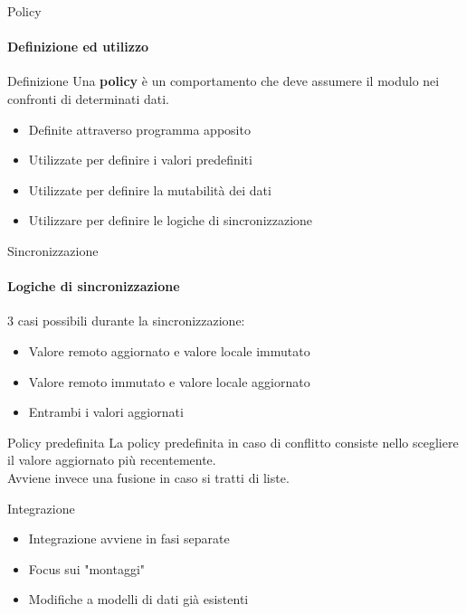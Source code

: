 \documentclass{beamer}
\begin{document}
\begin{darkframes}
  \begin{frame}{Policy}
    \framesubtitle{Definizione ed utilizzo}
    \begin{block}{Definizione}
      Una \textbf{policy} è un comportamento che deve assumere il modulo nei confronti di determinati dati.
    \end{block}
    \begin{itemize}
      \item Definite attraverso programma apposito
      \item Utilizzate per definire i valori predefiniti
      \item Utilizzate per definire la mutabilità dei dati
      \item Utilizzare per definire le logiche di sincronizzazione
    \end{itemize}

  \end{frame}

  \begin{frame}{Sincronizzazione}
    \framesubtitle{Logiche di sincronizzazione}
    3 casi possibili durante la sincronizzazione:
    \begin{itemize}
      \item Valore remoto aggiornato e valore locale immutato
      \item Valore remoto immutato e valore locale aggiornato
      \item Entrambi i valori aggiornati
    \end{itemize}

    \begin{block}{Policy predefinita}
      La policy predefinita in caso di conflitto consiste nello scegliere il valore aggiornato più recentemente.\\
      Avviene invece una fusione in caso si tratti di liste.
    \end{block}

  \end{frame}

  \begin{frame}{Integrazione}
    \begin{itemize}
      \item Integrazione avviene in fasi separate
      \item Focus sui "montaggi"
      \item Modifiche a modelli di dati già esistenti
    \end{itemize}
  \end{frame}


\end{darkframes}
\end{document}
